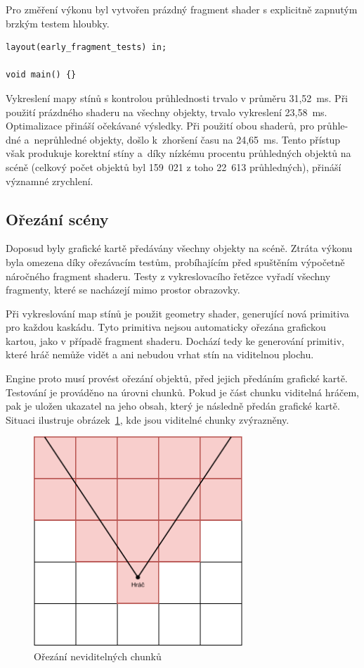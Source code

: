 \documentclass[thesis=M,czech]{FITthesis}[2019/12/23]
\begin{document}
Pro změření výkonu byl vytvořen prázdný fragment shader s explicitně zapnutým brzkým testem hloubky.

\begin{verbatim}
layout(early_fragment_tests) in;

void main() {}
\end{verbatim}

Vykreslení mapy stínů s kontrolou průhlednosti trvalo v průměru 31,52~ms. Při použití prázdného shaderu na všechny objekty, trvalo vykreslení 23,58~ms. Optimalizace přináší očekávané výsledky. Při použití obou shaderů, pro průhle-dné a~neprůhledné objekty, došlo k~zhoršení času na 24,65~ms. Tento přístup však produkuje korektní stíny a~díky nízkému procentu průhledných objektů na scéně (celkový počet objektů byl 159~021 z toho 22~613 průhledných), přináší významné zrychlení. 

\subsection{Ořezání scény}

Doposud byly grafické kartě předávány všechny objekty na scéně. Ztráta výkonu byla omezena díky ořezávacím testům, probíhajícím před spuštěním výpočetně náročného fragment shaderu. Testy z vykreslovacího řetězce vyřadí všechny fragmenty, které se nacházejí mimo prostor obrazovky.

Při vykreslování map stínů je použit geometry shader, generující nová primitiva pro každou kaskádu. Tyto primitiva nejsou automaticky ořezána grafickou kartou, jako v případě fragment shaderu. Dochází tedy ke generování primitiv, které hráč nemůže vidět a ani nebudou vrhat stín na viditelnou plochu.

Engine proto musí provést ořezání objektů, před jejich předáním grafické kartě. Testování je prováděno na úrovni chunků. Pokud je část chunku viditelná hráčem, pak je uložen ukazatel na jeho obsah, který je následně předán grafické kartě. Situaci ilustruje obrázek~\ref{fig:visible_chunks}, kde jsou viditelné chunky zvýrazněny.

\begin{figure}\centering
	\includegraphics[width=0.7\textwidth]{images/visible_chunks}
	\caption[Ořezání neviditelných chunků]{Ořezání neviditelných chunků}\label{fig:visible_chunks}
\end{figure}
\end{document}
